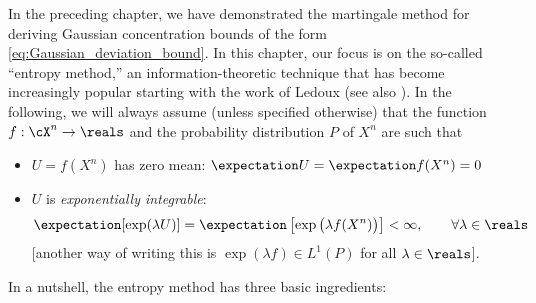 \documentclass{article}
\theoremstyle{plain}
\begin{document}
In the preceding chapter, we have demonstrated the martingale method for deriving Gaussian concentration bounds of the form \eqref{eq:Gaussian_deviation_bound}. In this chapter, our focus is on the so-called ``entropy method,'' an information-theoretic technique that has become increasingly popular starting with the work of Ledoux \cite{Ledoux_paper} (see also \cite{Ledoux}). In the following, we will always assume (unless specified otherwise) that the function $f : \cX^n \to \reals$ and the probability distribution $P$ of $X^n$ are such that
\begin{itemize}
	\item $U = f(X^n)$ has zero mean: $\expectation U = \expectation f(X^n) = 0$
	\item $U$ is {\em exponentially integrable}:
	\begin{align}\label{eq:U_expint}
		\expectation[\exp(\lambda U)] = \expectation\left[\exp\big(\lambda f(X^n)\big)\right] < \infty, \qquad \forall \lambda \in \reals
	\end{align}
	[another way of writing this is $\exp(\lambda f) \in L^1(P)$ for all $\lambda \in \reals$].
\end{itemize}
In a nutshell, the entropy method has three basic ingredients:
\end{document}
